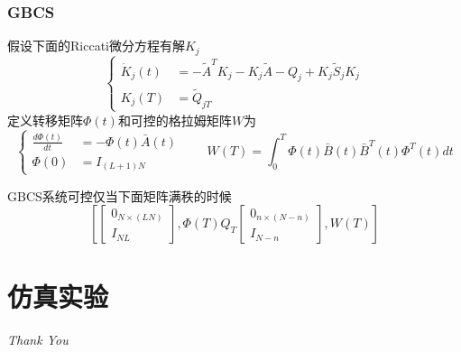 \documentclass[UTF8, aspectratio=169, 9pt]{ctexbeamer}
\begin{document}
\begin{frame}
\frametitle{GBCS}
假设下面的Riccati微分方程有解$K_j$
$$
\left\{\begin{aligned}
\dot{K}_{j}(t) &=-\widetilde{A}^{T} K_{j}-K_{j} \widetilde{A}-Q_{j}+K_{j} \widetilde{S}_{j} K_{j} \\
K_{j}(T) &=\widetilde{Q}_{j T}
\end{aligned}\right.
$$
定义转移矩阵$\Phi(t)$和可控的格拉姆矩阵$W$为
$$
\left\{\begin{aligned}
\frac{d \Phi(t)}{d t} &=-\Phi(t) \bar{A}(t) \\
\Phi(0) &=I_{(L+1) N}
\end{aligned}\right.
\qquad 
W(T)=\int_{0}^{T} \Phi(t) \bar{B}(t) \bar{B}^{T}(t) \Phi^{T}(t) d t
$$

\begin{theorem}
  GBCS系统可控仅当下面矩阵满秩的时候
  $$
  \left[\left[\begin{array}{c}
    0_{N \times(L N)} \\
    I_{N L}
    \end{array}\right], \Phi(T) Q_{T}\left[\begin{array}{c}
    0_{n \times(N-n)} \\
    I_{N-n}
    \end{array}\right], W(T)\right]
  $$
\end{theorem}
\end{frame}

\section{仿真实验}
\begin{frame}



\end{frame}

\thispagestyle{empty} 
\begin{frame}{}
  \centering \Huge
  \emph{Thank You}
\end{frame}
\end{document}

